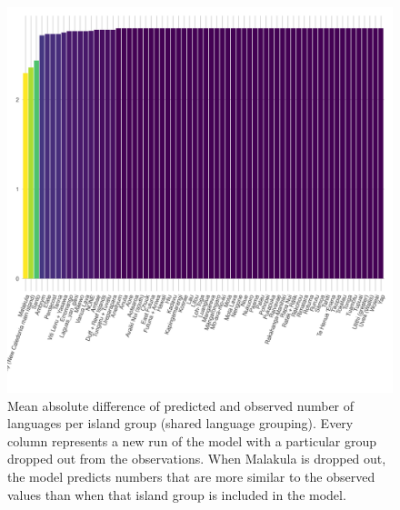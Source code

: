 \documentclass[12pt,letterpaper]{article}
\begin{document}
\begin{figure}[ht]
\includegraphics[width=15cm]{brms_medium_dropped_out_plot_diff.png}
\caption{Mean absolute difference of predicted and observed number of languages per island group (shared language grouping). Every column represents a new run of the model with a particular group dropped out from the observations. When Malakula is dropped out, the model predicts numbers that are more similar to the observed values than when that island group is included in the model.}
\label{brms_medium_dropped_out_plot_diff}
\end{figure}
\end{document}
